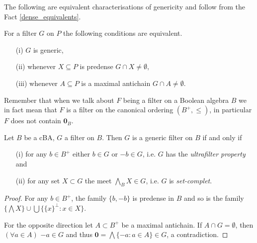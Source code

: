 The following are equivalent characterisations of genericity and follow
from the Fact \ref{dense_equivalents}.

\begin{fact}\label{generic-equivalence}
For a filter $G$ on $P$ the following conditions are equivalent.
\begin{itemize}
  \item[(i)] $G$ is generic,
  \item[(ii)] whenever $X\subseteq P$ is predense $G\cap X\neq\emptyset$,
  \item[(iii)] whenever $A\subseteq P$ is a maximal antichain $G\cap A\neq\emptyset$.
\end{itemize}
\end{fact}

Remember that when we talk about $F$ being a filter on a Boolean algebra $B$
we in fact mean that $F$ is a filter on the canonical ordering $(B^+,\leq)$, in particular
$F$ does not contain $\mathbf 0_B$.

\begin{fact}\label{set-complete}
Let $B$ be a cBA, $G$ a filter  on $B$. Then $G$ is a generic filter on $B$ if and only if
\begin{itemize}
 \item[(i)] for any $b \in B^+$ either $b \in G$ or $-b \in G$, i.e.
	 $G$ has the \emph{ultrafilter property} and
 \item[(ii)] for any set $X \subset G$ the meet $\bigwedge_B X \in G$, i.e.
	$G$ is \emph{set-complet}.
\end{itemize}
%
\end{fact}


\begin{proof}
 For any $b \in B^+$, the family $\{b,-b\}$ is predense in $B$
and
so is the family $\{\bigwedge X\} \cup \bigcup \{ \{x\}^\perp : x \in X \}$.

\smallskip

For the opposite direction let $A\subset B^+$ be a maximal antichain. If
$A \cap G = \emptyset$, then $(\forall a \in A)$ $-a \in G$ and thus
$\mathbf 0 = \bigwedge \{ -a : a \in A \} \in G$, a contradiction.
\end{proof}

